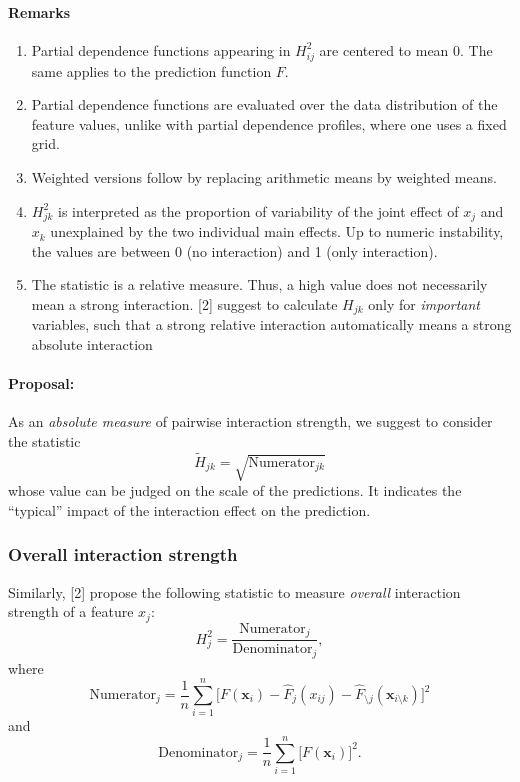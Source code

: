 \documentclass[]{article}
\begin{document}
\paragraph{Remarks}
\begin{enumerate}
	\item Partial dependence functions appearing in $H^2_{ij}$ are centered to mean 0. The same applies to the prediction function $F$.
	\item Partial dependence functions are evaluated over the data distribution of the feature values, unlike with partial dependence profiles, where one uses a fixed grid.
	\item Weighted versions follow by replacing arithmetic means by weighted means.
	\item $H_{jk}^2$ is interpreted as the proportion of variability of the joint effect of $x_j$ and $x_k$ unexplained by the two individual main effects. Up to numeric instability, the values are between 0 (no interaction) and 1 (only interaction).
	\item The statistic is a relative measure. Thus, a high value does not necessarily mean a strong interaction. [2] suggest to calculate $H_{jk}$ only for {\em important} variables, such that a strong relative interaction automatically means a strong absolute interaction
\end{enumerate}

\paragraph{Proposal:}
As an {\em absolute measure} of pairwise interaction strength, we suggest to consider the statistic
$$
  \tilde H_{jk} = \sqrt{\mathrm{Numerator}_{jk}}
$$
whose value can be judged on the scale of the predictions. It indicates the ``typical'' impact of the interaction effect on the prediction.

\subsubsection{Overall interaction strength}
Similarly, [2] propose the following statistic to measure {\em overall} interaction strength of a feature $x_j$:
$$
	H_{j}^2 = \frac{\textrm{Numerator}_j}{\textrm{Denominator}_j},
$$
where
$$
  {\textrm{Numerator}_j} = \frac{1}{n} \sum_{i = 1}^n\big[F(\mathbf{x}_i) - \hat F_j(x_{ij}) - \hat F_{\setminus j}(\mathbf{x}_{i\setminus k})\big]^2
$$
and
$$
  {\textrm{Denominator}_j} = \frac{1}{n} \sum_{i = 1}^n\big[F(\mathbf{x}_i)\big]^2.
$$
\end{document}

